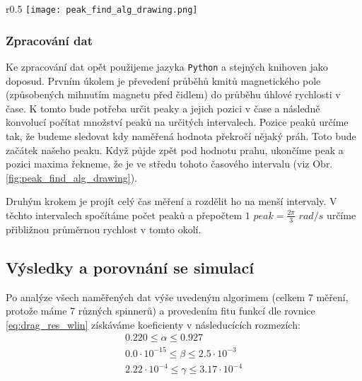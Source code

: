 \documentclass[12pt, a4paper,
 twoside,        %
 openright
]{report}
\begin{document}
\begin{wrapfigure}{r}{0.5\textwidth}
    \vspace*{3cm}
    \texttt{[image: peak\_find\_alg\_drawing.png]}
    \centering
    \caption{Ilustrace fungování algoritmu pro hledání peaků}
    \label{fig:peak_find_alg_drawing}
\end{wrapfigure}
\subsubsection{Zpracování dat}
Ke zpracování dat opět použijeme jazyka \texttt{Python} a stejných knihoven jako doposud.
Prvním úkolem je převedení průběhů kmitů magnetického pole (způsobených mihnutím magnetu před čidlem) do průběhu úhlové rychlosti v čase.
K tomto bude potřeba určit peaky a jejich pozici v čase a následně konvolucí počítat množství peaků na určitých intervalech.
Pozice peaků určíme tak, že budeme sledovat kdy naměřená hodnota překročí nějaký práh. Toto bude začátek našeho peaku.
Když půjde zpět pod hodnotu prahu, ukončíme peak a pozici maxima řekneme, že je ve středu tohoto časového intervalu (viz Obr. \ref{fig:peak_find_alg_drawing}).

\clearpage

Druhým krokem je projít celý čas měření a rozdělit ho na menší intervaly. V těchto intervalech spočítáme počet peaků a přepočtem $1$ $peak = \frac{2\pi}{3}$ $rad/s$ určíme přibližnou průměrnou rychlost v tomto okolí.

\clearpage


\subsection{Výsledky a porovnání se simulací}
Po analýze všech naměřených dat výše uvedeným algorimem (celkem 7 měření, protože máme 7 různých spinnerů) a provedením fitu funkcí dle rovnice \ref{eq:drag_res_wlin} získáváme koeficienty v následucících rozmezích:
\begin{equation}
    \label{eq:drag_coef_res}
    \begin{gathered}
        0.220 \leq \alpha \leq 0.927 \\
        0.0 \cdot 10^{-15} \leq \beta \leq 2.5 \cdot 10^{-3} \\
        2.22 \cdot 10^{-4} \leq \gamma \leq 3.17 \cdot 10^{-4} \\
    \end{gathered}
\end{equation}
\end{document}
